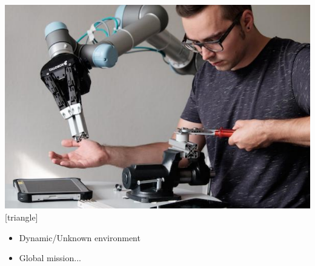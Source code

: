 \begin{frame}[noframenumbering]
\begin{columns}
                \column{.47\paperwidth}
                \begin{center}
                \vspace{-14.6mm}
                        \includegraphics[width=\textwidth ]{figures/complx_sit.pdf}
[triangle]    
 \vspace{2mm}                    
\begin{itemize}
\item Dynamic/Unknown environment
\item Global mission...
\end{itemize}

                        \end{center}

\end{columns}

\end{frame}


